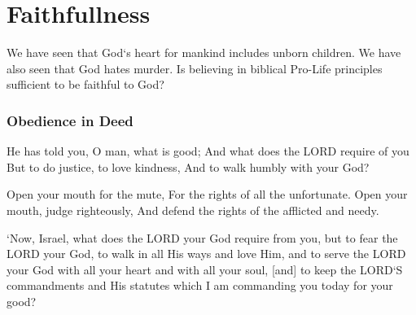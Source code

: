 \chapter{Faithfullness}

We have seen that God`s heart for mankind includes unborn children. We have also seen that God hates murder. Is believing in biblical Pro-Life principles sufficient to be faithful to God?

\subsection{Obedience in Deed}
\begin{scripture}[Micah 6:8]
    He has told you, O man, what is good; 
    And what does the LORD require of you But to do justice, to love kindness, And to walk humbly with your God?
\end{scripture}

\vspace{2\baselineskip}

\vspace{4\baselineskip}


\vspace{4\baselineskip}


\begin{scripture}[Proverbs 31:8-9]
    Open your mouth for the mute, For the rights of all the unfortunate.  
    Open your mouth, judge righteously, And defend the rights of the afflicted and needy.
\end{scripture}

\vspace{2\baselineskip}

\begin{scripture}[Deuteronomy 10:12-13]
    `Now, Israel, what does the LORD your God require from you, but to fear the LORD your God, to walk in all His ways and love Him, and to serve the LORD your God with all your heart and with all your soul,
    [and] to keep the LORD`S commandments and His statutes which I am commanding you today for your good?
\end{scripture}

